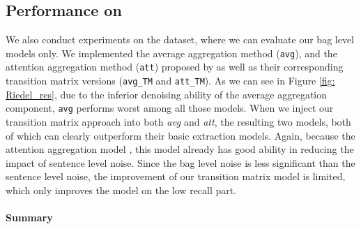 \subsection{Performance on \EntityRE}
We also conduct experiments on the \EntityRE dataset, where we can evaluate our bag level models only. 
We  implemented the average aggregation method (\texttt{avg}), and the attention aggregation method (\texttt{att}) proposed by \cite{lin2016neural} as well as their corresponding transition matrix versions (\texttt{avg\_TM} and \texttt{att\_TM}). As we can see in Figure \ref{fig: Riedel_res},  due to the inferior denoising ability of the average aggregation component, \texttt{avg} performs worst among all those models. %
When we inject our transition matrix approach into both \emph{avg} and \emph{att}, the resulting two  models, both of which can  clearly outperform their basic extraction models.
%
Again, because the attention aggregation model , this model already has good ability in reducing the impact of sentence level noise. Since the bag level noise is less significant than the sentence level noise, the improvement of our transition matrix model is limited, which only improves the model on the low recall part.

\paragraph{Summary}
